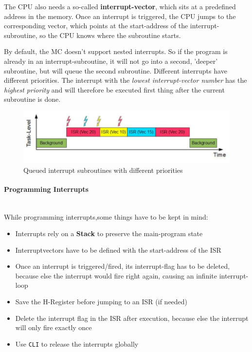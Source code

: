 \documentclass[a4paper, 11pt, nofootinbib]{article}
\newcommand{\code}[1]{\texttt{#1}}
\begin{document}
\noindent The CPU also needs a so-called \textbf{interrupt-vector}, which sits at a predefined address in the memory. Once an interrupt is triggered, the CPU jumps to the corresponding vector, which points at the start-address of the interrupt-subroutine, so the CPU knows where the subroutine starts.
\vspace{10px}

\noindent By default, the MC doesn't support nested interrupts. So if the program is already in an interrupt-subroutine, it will not go into a second, 'deeper' subroutine, but will queue the second subroutine. Different interrupts have different priorities. The interrupt with the \textit{lowest interrupt-vector number} has the \textit{highest priority} and will therefore be executed first thing after the current subroutine is done.

\begin{figure}[htb]
	\centering
	\includegraphics[keepaspectratio=true,height=7\baselineskip]{interrupt_priority.jpg}
	\caption{Queued interrupt subroutines with different priorities}
	\label{fig:interrupt_prio}
\end{figure}

\paragraph{Programming Interrupts}\mbox{}\\
While programming interrupts,some things have to be kept in mind:

\begin{itemize}
	\item Interrupts rely on a \textbf{Stack} to preserve the main-program state
	\item Interruptvectors have to be defined with the start-address of the ISR
	\item Once an interrupt is triggered/fired, its interrupt-flag has to be deleted, because else the interrupt would fire right again, causing an infinite interrupt-loop
	\item Save the H-Register before jumping to an ISR (if needed)
	\item Delete the interrupt flag in the ISR after execution, because else the interrupt will only fire exactly once
	\item Use \code{CLI} to release the interrupts globally
\end{itemize}
\end{document}
